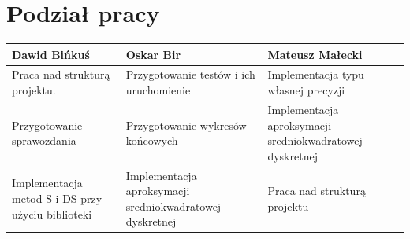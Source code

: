 \documentclass[10pt]{article}
\begin{document}
\section{Podział pracy}
\centering
\begin{tabular}{| p{4.4cm} | p{4.4cm} | p{4.4cm} |}
	\hline
	\textbf{Dawid Bińkuś} & \textbf{Oskar Bir} & \textbf{Mateusz Małecki} \\ \hline
	Praca nad strukturą projektu. & Przygotowanie testów i ich uruchomienie & Implementacja typu własnej precyzji \\ \hline
	Przygotowanie sprawozdania & Przygotowanie wykresów końcowych & Implementacja aproksymacji sredniokwadratowej dyskretnej\\ \hline
	Implementacja metod S i DS przy użyciu biblioteki & Implementacja aproksymacji sredniokwadratowej dyskretnej & Praca nad strukturą projektu \\ \hline	
	\end{tabular}
\end{document}
